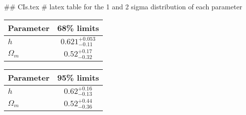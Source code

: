 ## CIs.tex
# latex table for the 1 and 2 sigma distribution of each parameter

\begin{tabular} { l  c}
 Parameter &  68\% limits\\
\hline
{\boldmath$h              $} & $0.621^{+0.053}_{-0.11}    $\\
{\boldmath$\Omega_m       $} & $0.52^{+0.17}_{-0.32}      $\\
\hline
\end{tabular}

\begin{tabular} { l  c}
 Parameter &  95\% limits\\
\hline
{\boldmath$h              $} & $0.62^{+0.16}_{-0.13}      $\\
{\boldmath$\Omega_m       $} & $0.52^{+0.44}_{-0.36}      $\\
\hline
\end{tabular}

